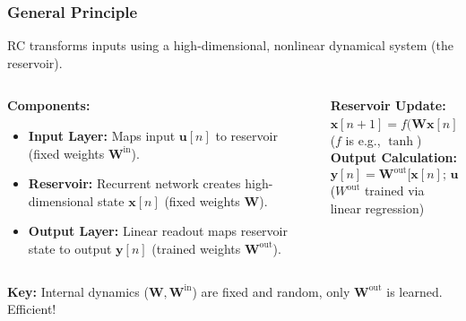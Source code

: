 \documentclass{beamer}
\begin{document}
\begin{frame}
    \frametitle{General Principle}
    RC transforms inputs using a high-dimensional, nonlinear dynamical system (the reservoir).
    \begin{columns}[T] %
        \begin{column}{0.4\textwidth} %
            \textbf{Components:}
            \begin{itemize}
                \item \textbf{Input Layer:} Maps input $\mathbf{u}[n]$ to reservoir (fixed weights $\mathbf{W}^{\mathrm{in}}$).
                \item \textbf{Reservoir:} Recurrent network creates high-dimensional state $\mathbf{x}[n]$ (fixed weights $\mathbf{W}$).
                \item \textbf{Output Layer:} Linear readout maps reservoir state to output $\mathbf{y}[n]$ (trained weights $\mathbf{W}^{\mathrm{out}}$).
            \end{itemize}
        \end{column}
        \begin{column}{0.6\textwidth} %
            \textbf{Reservoir Update:}
            \[
            \mathbf{x}[n+1] = f\bigl(\mathbf{W}\mathbf{x}[n] + \mathbf{W}^{\mathrm{in}}\mathbf{u}[n] + \mathbf{b}\bigr)
            \]
            (\(f\) is e.g., $\tanh$)
            \pause\medskip
            \textbf{Output Calculation:}
            \[
            \mathbf{y}[n] = \mathbf{W}^{\mathrm{out}}\bigl[\mathbf{x}[n];\,\mathbf{u}[n]\bigr]
            \]
            (\(W^{\mathrm{out}}\) trained via linear regression)
        \end{column}
    \end{columns}
    \pause\bigskip
    \textbf{Key:} Internal dynamics ($\mathbf{W}, \mathbf{W}^{\mathrm{in}}$) are fixed and random, only $\mathbf{W}^{\mathrm{out}}$ is learned. Efficient!
\end{frame}
\end{document}
